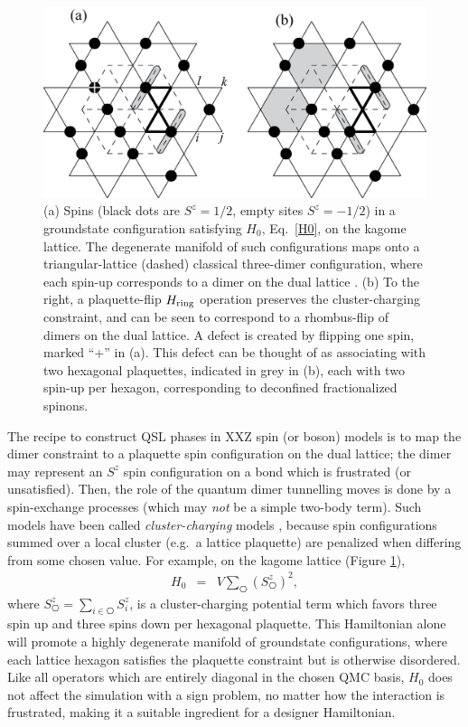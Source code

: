 \documentclass[range]{ar2e}
\begin{document}
\begin{figure}
\centerline{\includegraphics[width=4.5in]{kagome}}
\caption{ (a) Spins (black dots are $S^z = 1/2$, empty sites $S^z = -1/2$) in a groundstate configuration satisfying $H_0$, Eq.~\ref{H0}, on the kagome lattice.  
The degenerate manifold of such configurations maps onto a triangular-lattice (dashed) classical three-dimer configuration, where each spin-up corresponds to a dimer 
on the dual lattice \cite{BFG}.  (b) To the right, a plaquette-flip $H_{\rm ring}$ operation preserves the cluster-charging constraint, and can be seen to correspond 
to a rhombus-flip of dimers on the dual lattice.  A defect is created by flipping one spin, marked ``+'' in (a).  This defect can be thought of as associating with 
two hexagonal plaquettes, indicated in grey in (b), each with two spin-up per hexagon, corresponding to deconfined fractionalized spinons.} \label{kag_fig}
\end{figure}

The recipe to construct QSL phases in XXZ spin (or boson) models is to map the dimer constraint to a plaquette spin configuration on the dual lattice; the dimer may represent an $S^z$ spin configuration on a bond which is frustrated (or unsatisfied).  Then, the role of the quantum dimer tunnelling moves is done by a spin-exchange processes (which may {\it not} be a simple two-body term).  Such models have been called
{\it cluster-charging} models \cite{Isakov2}, because spin configurations summed over a local cluster (e.g.~a lattice plaquette) are penalized when differing from some chosen value.  For example, on the kagome lattice (Figure \ref{kag_fig}),
\begin{eqnarray}
H_0 &=& V \sum_{\hexagon} (S^z_{\hexagon})^2,  \label{H0}
\end{eqnarray}
where $S^z_{\hexagon} = \sum_{i \in \hexagon}S^z_i$,
is a cluster-charging potential term which favors three spin up and three spins down per hexagonal plaquette.  This Hamiltonian alone will promote a highly degenerate manifold of groundstate configurations, where each lattice hexagon satisfies the plaquette constraint but is otherwise disordered.  
Like all operators which are entirely diagonal in the chosen QMC basis, $H_0$ does not affect the simulation with a sign problem, no matter how the interaction is frustrated, making it a suitable ingredient for a designer Hamiltonian.
\end{document}
